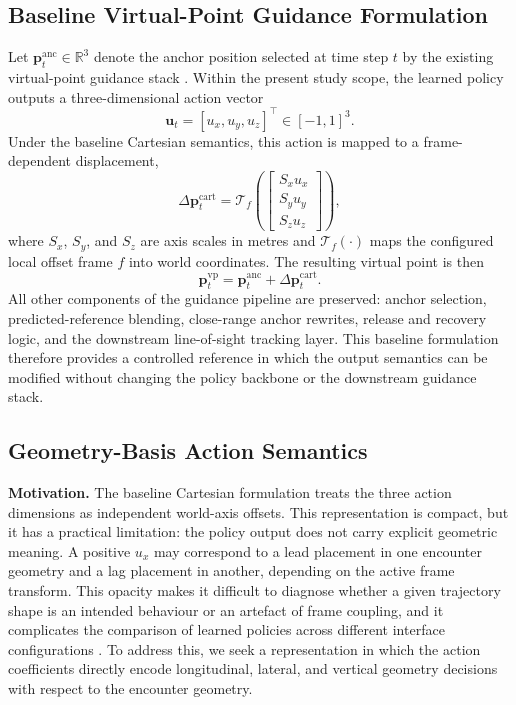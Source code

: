 \documentclass[drones,article,submit,pdftex,moreauthors]{Definitions/mdpi}
\begin{document}
\subsection{Baseline Virtual-Point Guidance Formulation}

Let $\mathbf{p}^{\mathrm{anc}}_t \in \mathbb{R}^3$ denote the anchor position selected at time step $t$ by the existing virtual-point guidance stack \cite{xu2022ast}. Within the present study scope, the learned policy outputs a three-dimensional action vector
\begin{equation}
\mathbf{u}_t = [u_x, u_y, u_z]^\top \in [-1,1]^3.
\end{equation}
Under the baseline Cartesian semantics, this action is mapped to a frame-dependent displacement,
\begin{equation}
\Delta \mathbf{p}^{\mathrm{cart}}_t =
\mathcal{T}_f
\left(
\begin{bmatrix}
S_x u_x \\
S_y u_y \\
S_z u_z
\end{bmatrix}
\right),
\end{equation}
where $S_x$, $S_y$, and $S_z$ are axis scales in metres and $\mathcal{T}_f(\cdot)$ maps the configured local offset frame $f$ into world coordinates. The resulting virtual point is then
\begin{equation}
\mathbf{p}^{\mathrm{vp}}_t = \mathbf{p}^{\mathrm{anc}}_t + \Delta \mathbf{p}^{\mathrm{cart}}_t.
\end{equation}
All other components of the guidance pipeline are preserved: anchor selection, predicted-reference blending, close-range anchor rewrites, release and recovery logic, and the downstream line-of-sight tracking layer. This baseline formulation therefore provides a controlled reference in which the output semantics can be modified without changing the policy backbone or the downstream guidance stack.

\subsection{Geometry-Basis Action Semantics}

\textbf{Motivation.} The baseline Cartesian formulation treats the three action dimensions as independent world-axis offsets. This representation is compact, but it has a practical limitation: the policy output does not carry explicit geometric meaning. A positive $u_x$ may correspond to a lead placement in one encounter geometry and a lag placement in another, depending on the active frame transform. This opacity makes it difficult to diagnose whether a given trajectory shape is an intended behaviour or an artefact of frame coupling, and it complicates the comparison of learned policies across different interface configurations \cite{lai2026aerospace}. To address this, we seek a representation in which the action coefficients directly encode longitudinal, lateral, and vertical geometry decisions with respect to the encounter geometry.
\end{document}

